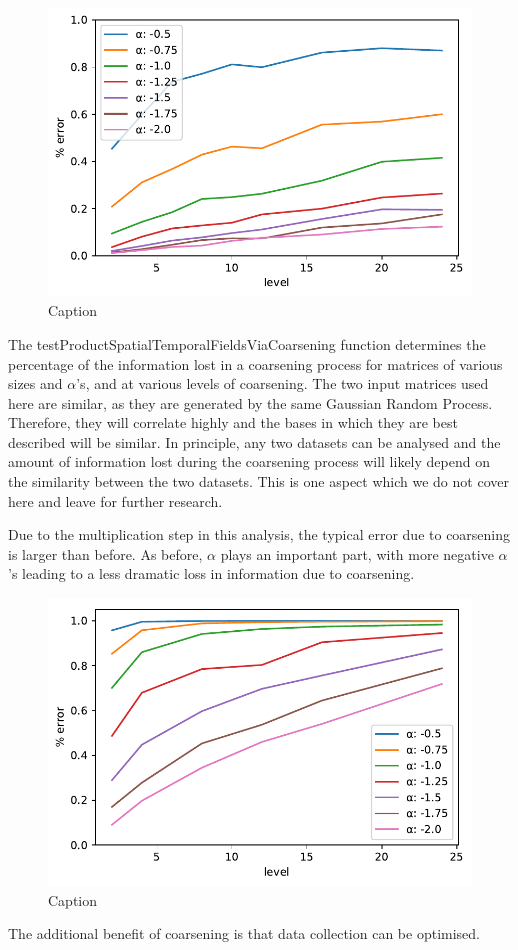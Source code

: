 \documentclass{acm_proc_article-sp}
\begin{document}
\begin{figure}[h]
\begin{center}
\includegraphics[width=0.8\columnwidth]{Results/plotSingleSpatialFieldViaCoarsening.pdf}
\caption[Small caption]{Caption}
\label{fig:plotSingleSpatialFieldViaCoarsening}
\end{center}
\end{figure}
The testProductSpatialTemporalFieldsViaCoarsening function determines the percentage of the information lost in a coarsening process for matrices of various sizes and $\alpha$'s, and at various levels of coarsening. The two input matrices used here are similar, as they are generated by the same Gaussian Random Process. Therefore, they will correlate highly and the bases in which they are best described will be similar. In principle, any two datasets can be analysed and the amount of information lost during the coarsening process will likely depend on the similarity between the two datasets. This is one aspect which we do not cover here and leave for further research.

Due to the multiplication step in this analysis, the typical error due to coarsening is larger than before. As before, $\alpha$ plays an important part, with more negative $\alpha$'s leading to a less dramatic loss in information due to coarsening.

\begin{figure}[h]
\begin{center}
\includegraphics[width=0.8\columnwidth]{Results/plotProductSpatialTemporalFieldsViaCoarsening.pdf}
\caption[Small caption]{Caption}
\label{fig:plotProductSpatialTemporalFieldsViaCoarsening}
\end{center}
\end{figure}
The additional benefit of coarsening is that data collection can be optimised.
\end{document}
